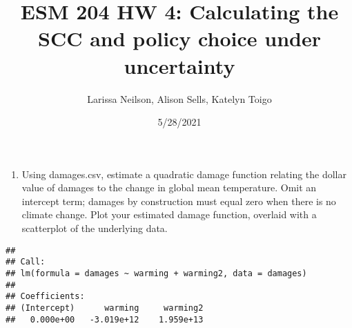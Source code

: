 \documentclass[
]{article}
\title{ESM 204 HW 4: Calculating the SCC and policy choice under uncertainty}
\author{Larissa Neilson, Alison Sells, Katelyn Toigo}
\date{5/28/2021}
\newenvironment{Shaded}{\begin{snugshade}}{\end{snugshade}}
\newcommand{\CommentTok}[1]{\textcolor[rgb]{0.56,0.35,0.01}{\textit{#1}}}
\newcommand{\DataTypeTok}[1]{\textcolor[rgb]{0.13,0.29,0.53}{#1}}
\newcommand{\DecValTok}[1]{\textcolor[rgb]{0.00,0.00,0.81}{#1}}
\newcommand{\KeywordTok}[1]{\textcolor[rgb]{0.13,0.29,0.53}{\textbf{#1}}}
\newcommand{\NormalTok}[1]{#1}
\newcommand{\OperatorTok}[1]{\textcolor[rgb]{0.81,0.36,0.00}{\textbf{#1}}}
\newcommand{\StringTok}[1]{\textcolor[rgb]{0.31,0.60,0.02}{#1}}
\providecommand{\tightlist}{%
  \setlength{\itemsep}{0pt}\setlength{\parskip}{0pt}}
\begin{document}
\maketitle

\begin{Shaded}
\end{Shaded}

\begin{enumerate}
\def\labelenumi{\arabic{enumi}.}
\tightlist
\item
  Using damages.csv, estimate a quadratic damage function relating the
  dollar value of damages to the change in global mean temperature. Omit
  an intercept term; damages by construction must equal zero when there
  is no climate change. Plot your estimated damage function, overlaid
  with a scatterplot of the underlying data.
\end{enumerate}

\begin{Shaded}
\end{Shaded}

\begin{verbatim}
## 
## Call:
## lm(formula = damages ~ warming + warming2, data = damages)
## 
## Coefficients:
## (Intercept)      warming     warming2  
##   0.000e+00   -3.019e+12    1.959e+13
\end{verbatim}
\end{document}
